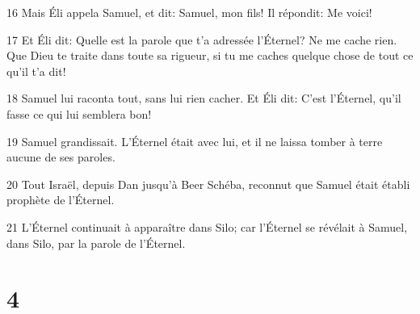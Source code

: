 \par 16 Mais Éli appela Samuel, et dit: Samuel, mon fils! Il répondit: Me voici!
\par 17 Et Éli dit: Quelle est la parole que t'a adressée l'Éternel? Ne me cache rien. Que Dieu te traite dans toute sa rigueur, si tu me caches quelque chose de tout ce qu'il t'a dit!
\par 18 Samuel lui raconta tout, sans lui rien cacher. Et Éli dit: C'est l'Éternel, qu'il fasse ce qui lui semblera bon!
\par 19 Samuel grandissait. L'Éternel était avec lui, et il ne laissa tomber à terre aucune de ses paroles.
\par 20 Tout Israël, depuis Dan jusqu'à Beer Schéba, reconnut que Samuel était établi prophète de l'Éternel.
\par 21 L'Éternel continuait à apparaître dans Silo; car l'Éternel se révélait à Samuel, dans Silo, par la parole de l'Éternel.

\chapter{4}

